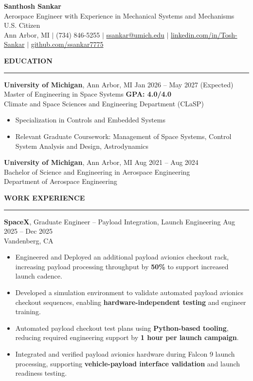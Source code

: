 \documentclass[10pt]{article}
\newcommand{\ressection}[1]{
  \vspace{0.12em}
  {\large\bfseries #1}\par
  \vspace{0.05em}\hrule\vspace{0.12em}
}
\begin{document}
\begin{center}
{\LARGE {\bfseries Santhosh Sankar}} \\
{\small Aerospace Engineer with Experience in Mechanical Systems and Mechanisms} \\
{\small U.S. Citizen} \\
Ann Arbor, MI \enspace $\vert$ \enspace (734) 846-5255 \enspace $\vert$ \enspace
\href{mailto:ssankar@umich.edu}{ssankar@umich.edu} \enspace $\vert$ \enspace
\href{https://www.linkedin.com/in/santhosh-sankar-3241521b8/}{linkedin.com/in/Tosh-Sankar} \enspace $\vert$ \enspace
\href{https://github.com/ssankar7775}{github.com/ssankar7775}
\end{center}

\ressection{EDUCATION}

{\bfseries University of Michigan}, Ann Arbor, MI \hfill Jan 2026 -- May 2027 (Expected) \\
Master of Engineering in Space Systems \hfill {\bfseries GPA: 4.0/4.0} \\
Climate and Space Sciences and Engineering Department (CLaSP)

\begin{itemize}
  \item Specialization in Controls and Embedded Systems
  \item Relevant Graduate Coursework: Management of Space Systems, Control System Analysis and Design, Astrodynamics
\end{itemize}

{\bfseries University of Michigan}, Ann Arbor, MI \hfill Aug 2021 -- Aug 2024 \\
Bachelor of Science and Engineering in Aerospace Engineering \\
Department of Aerospace Engineering

\ressection{WORK EXPERIENCE}

{\bfseries SpaceX}, Graduate Engineer -- Payload Integration, Launch Engineering \hfill Aug 2025 -- Dec 2025 \\
Vandenberg, CA
\begin{itemize}
\item Engineered and Deployed an additional payload avionics checkout rack, increasing payload processing throughput by \textbf{50\%} to support increased launch cadence.
\item Developed a simulation environment to validate automated payload avionics checkout sequences, enabling \textbf{hardware-independent testing} and engineer training.
\item Automated payload checkout test plans using \textbf{Python-based tooling}, reducing required engineering support by \textbf{1 hour per launch campaign}.
\item Integrated and verified payload avionics hardware during Falcon 9 launch processing, supporting \textbf{vehicle-payload interface validation} and launch readiness testing.
\end{itemize}
\end{document}
